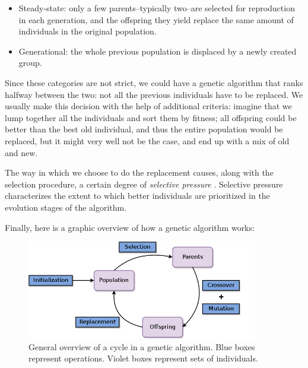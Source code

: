 		\begin{itemize}

			\item
			Steady-state: only a few parents--typically two--are selected for reproduction in each generation, and the offspring they yield replace the same amount of individuals in the original population.

			\item
			Generational: the whole previous population is displaced by a newly created group.

		\end{itemize}

		Since these categories are not strict, we could have a genetic algorithm that ranks halfway between the two: not all the previous individuals have to be replaced. We usually make this decision with the help of additional criteria: imagine that we lump together all the individuals and sort them by fitness; all offspring could be better than the best old individual, and thus the entire population would be replaced, but it might very well not be the case, and end up with a mix of old and new.

		The way in which we choose to do the replacement causes, along with the selection procedure, a certain degree of \textit{selective pressure} \cite{selection-ga}. Selective pressure characterizes the extent to which better individuals are prioritized in the evolution stages of the algorithm.

		Finally, here is a graphic overview of how a genetic algorithm works:

		\vspace{0.2cm}

	    \begin{figure}[bth]

	        \myfloatalign
	        \includegraphics[width=0.9\textwidth]{gfx/GeneticAlgorithm.png}
	        \caption{General overview of a cycle in a genetic algorithm. Blue boxes represent operations. Violet boxes represent sets of individuals.}

	    \end{figure}

